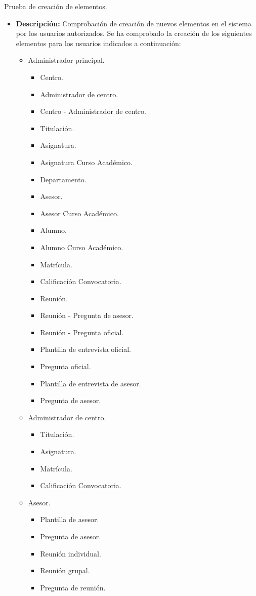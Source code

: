 \item Prueba de creación de elementos.
  \begin{itemize}
    \item \textbf{Descripción:} Comprobación de creación de nuevos elementos
    en el sistema por los usuarios autorizados. Se ha comprobado la creación de
    los siguientes elementos para los usuarios indicados a continuación:

    \begin{itemize}
      \item Administrador principal.
      \begin{itemize}
        \item Centro.
        \item Administrador de centro.
        \item Centro - Administrador de centro.
        \item Titulación.
        \item Asignatura.
        \item Asignatura Curso Académico.
        \item Departamento.
        \item Asesor.
        \item Asesor Curso Académico.
        \item Alumno.
        \item Alumno Curso Académico.
        \item Matrícula.
        \item Calificación Convocatoria.
        \item Reunión.
        \item Reunión - Pregunta de asesor.
        \item Reunión - Pregunta oficial.
        \item Plantilla de entrevista oficial.
        \item Pregunta oficial.
        \item Plantilla de entrevista de asesor.
        \item Pregunta de asesor.
      \end{itemize}
      \item Administrador de centro.
      \begin{itemize}
        \item Titulación.
        \item Asignatura.
        \item Matrícula.
        \item Calificación Convocatoria.
      \end{itemize}
      \item Asesor.
      \begin{itemize}
        \item Plantilla de asesor.
        \item Pregunta de asesor.
        \item Reunión individual.
        \item Reunión grupal.
        \item Pregunta de reunión.
      \end{itemize}
    \end{itemize}


\end{itemize}

